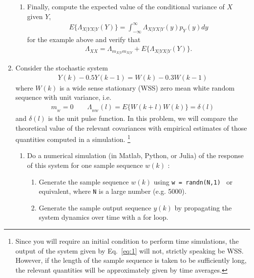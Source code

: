 \documentclass[letterpaper,12pt]{article}
\begin{document}
\begin{enumerate}
\begin{enumerate}
    \item
    Finally, compute the expected value of the conditional variance of $X$ given $Y$,
    \begin{align*}
E\{\Lambda_{X|Y X|Y}(Y)\} = \int_{-\infty}^\infty \Lambda_{X|Y X|Y}(y) p_{Y}(y) dy
    \end{align*}
for the example above and verify that
    \begin{align*}
\Lambda_{XX} = \Lambda_{m_{X|Y} m_{X|Y}} + E\{\Lambda_{X|Y X|Y}(Y)\}.
    \end{align*}


\end{enumerate}




\item
Consider the stochastic system
\begin{align}
    \label{eq:1}
    Y(k) - 0.5 Y(k-1) = W(k) - 0.3 W(k-1)
\end{align}
where $W(k)$ is a wide sense stationary (WSS) zero mean white random sequence with unit variance, i.e.
\begin{align*}
    m_{_W} = 0 \hspace{2em} \Lambda_{_{WW}}(l)  = E\{W(k+l)W(k)\} = \delta(l)
\end{align*}
and $\delta(l)$ is the unit pulse function. In this problem, we will compare the theoretical value of the relevant covariances with empirical estimates of those quantities computed in a simulation.
\footnote{Since you will require an initial condition to perform time simulations, the output of the system given by Eq.~\eqref{eq:1} will not, strictly speaking be WSS. However, if the length of the sample sequence is taken to be sufficiently long, the relevant quantities will be approximately given by time averages.}

\begin{enumerate}

\item
Do a numerical simulation (in Matlab, Python, or Julia) of the response of this system for one sample sequence $w(k)$ :

\begin{enumerate}
    \item
    Generate the sample sequence $w(k)$ using {\tt w = randn(N,1) } or equivalent, where {\tt N} is a large number (e.g. 5000).

    \item
    Generate the sample output sequence $y(k)$ by propagating the system dynamics over time with a for loop.


\end{enumerate}
\end{enumerate}
\end{enumerate}
\end{document}
